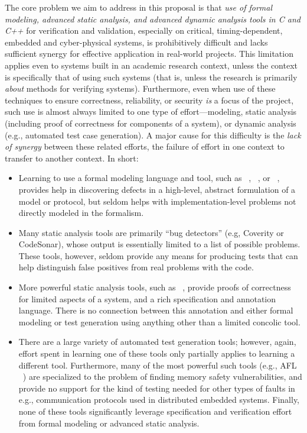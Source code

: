 The core problem we aim to address in this proposal is that \emph{use of formal modeling, advanced static analysis, and advanced dynamic analysis tools in C and C++} for verification and validation, especially on critical, timing-dependent, embedded and cyber-physical systems, is prohibitively difficult and lacks sufficient synergy for effective application in real-world projects.  This limitation applies even to systems built in an academic research context, unless the context is specifically that of using such systems (that is, unless the research is primarily \emph{about} methods for verifying systems).  Furthermore, even when use of these techniques to ensure correctness, reliability, or security \emph{is} a focus of the project, such use is almost always limited to one type of effort---modeling, static analysis (including proof of correctness for components of a system), or dynamic analysis (e.g., automated test case generation).  A major cause for this difficulty is the \emph{lack of synergy} between these related efforts, the failure of effort in one context to transfer to another context.  In short:

\begin{itemize}[labelsep=3pt,leftmargin=12pt]
\item Learning to use a formal modeling language and tool, such as \uppaal~\cite{uppaal}, \prism~\cite{KNP2011:CAV}, or \spin~\cite{SPIN}, provides help in discovering defects in a high-level, abstract formulation of a model or protocol, but seldom helps with implementation-level problems not directly modeled in the formalism.
\item Many static analysis tools are primarily ``bug detectors'' (e.g, Coverity or CodeSonar), whose output is essentially limited to a list of possible problems.  These tools, however, seldom provide any means for producing tests that can help distinguish false positives from real problems with the code.
\item More powerful static analysis tools, such as \framac~\cite{KKP2015:FAC}, provide proofs of correctness for limited aspects of a system, and a rich specification and annotation language.  There is no connection between this annotation and either formal modeling or test generation using anything other than a limited concolic tool.
\item There are a large variety of automated test generation tools; however, again, effort spent in learning one of these tools only partially applies to learning a different tool.  Furthermore, many of the most powerful such tools (e.g., AFL ~\cite{aflfuzz}) are specialized to the problem of finding memory safety vulnerabilities, and provide no support for  the kind of testing needed for  other types of faults in e.g., communication protocols used in distributed embedded systems.  Finally, none of these tools significantly leverage specification and verification effort from formal modeling or advanced static analysis.
\end{itemize}

